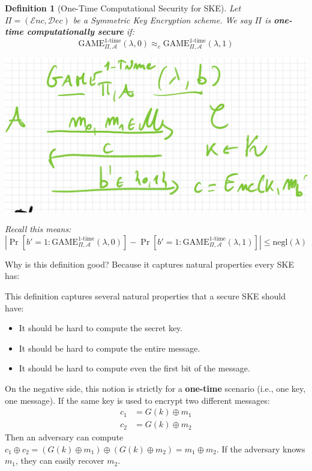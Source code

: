 \documentclass[11pt, a4paper]{article}
\newcommand{\enc}{\mathcal{E}nc}
\newcommand{\dec}{\mathcal{D}ec}
\newcommand{\game}{\text{GAME}}
\newtheorem{defn}{Definition}
\begin{document}
\begin{defn}[One-Time Computational Security for SKE]

Let $\Pi = (\enc, \dec)$ be a Symmetric Key Encryption scheme. We say $\Pi$ is \textbf{one-time computationally secure} if:\\
$$ \game_{\Pi, \mathcal{A}}^{1\text{-time}}(\lambda, 0) \approx_c \game_{\Pi, \mathcal{A}}^{1\text{-time}}(\lambda, 1) $$
\begin{center}
    \includegraphics[scale=0.4]{img/Comp_sec/example1.png}
\end{center}
Recall this means:
$$|\Pr[b' = 1\colon \game_{\Pi, \mathcal{A}}^{1\text{-time}}(\lambda, 0)] - \Pr[b' = 1\colon \game_{\Pi, \mathcal{A}}^{1\text{-time}}(\lambda, 1)]| \leq \text{negl}(\lambda)$$
\end{defn}
Why is this definition good? Because it captures natural properties every SKE has:

This definition captures several natural properties that a secure SKE should have:
\begin{itemize}
    \item It should be hard to compute the secret key.
    \item It should be hard to compute the entire message.
    \item It should be hard to compute even the first bit of the message.
\end{itemize}


On the negative side, this notion is strictly for a \textbf{one-time} scenario (i.e., one key, one message). If the same key is used to encrypt two different messages:
\begin{align*}
    c_1 &= G(k) \oplus m_1 \\
    c_2 &= G(k) \oplus m_2
\end{align*}
Then an adversary can compute $c_1 \oplus c_2 = (G(k) \oplus m_1) \oplus (G(k) \oplus m_2) = m_1 \oplus m_2$. If the adversary knows $m_1$, they can easily recover $m_2$.
\end{document}
